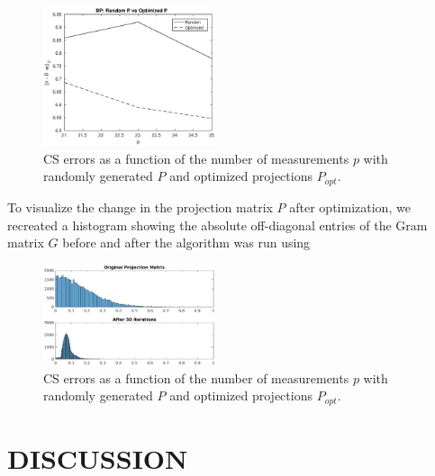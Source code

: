 \documentclass[journal]{IEEEtran}
\begin{document}
\begin{figure}[]
  \centering
  \includegraphics[width=0.45\textwidth]{rel_errors.eps}
  \caption{CS errors as a function of the number of measurements $p$ with randomly generated $P$ and optimized projections $P_{opt}$.}
  \label{fig:err}
\end{figure}

To visualize the change in the projection matrix $P$ after optimization, we recreated a histogram showing the absolute off-diagonal entries of the Gram matrix $G$ before and after the algorithm was run using 

\begin{figure}[]
  \centering
  \includegraphics[width=0.45\textwidth]{hist.eps}
  \caption{CS errors as a function of the number of measurements $p$ with randomly generated $P$ and optimized projections $P_{opt}$.}
  \label{fig:hist}
\end{figure}

\section{DISCUSSION}





{}
\end{document}
